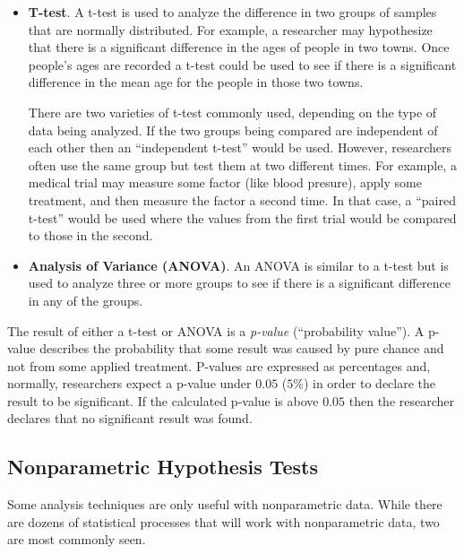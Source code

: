\begin{itemize}
	\item \textbf{T-test}. A t-test is used to analyze the difference in two groups of samples that are normally distributed. For example, a researcher may hypothesize that there is a significant difference in the ages of people in two towns. Once people's ages are recorded a t-test could be used to see if there is a significant difference in the mean age for the people in those two towns.
	
	There are two varieties of t-test commonly used, depending on the type of data being analyzed. If the two groups being compared are independent of each other then an ``independent t-test'' would be used. However, researchers often use the same group but test them at two different times. For example, a medical trial may measure some factor (like blood presure), apply some treatment, and then measure the factor a second time. In that case, a ``paired t-test'' would be used where the values from the first trial would be compared to those in the second.
	
	\item \textbf{Analysis of Variance (ANOVA)}. An ANOVA is similar to a t-test but is used to analyze three or more groups to see if there is a significant difference in any of the groups.
\end{itemize}

The result of either a t-test or ANOVA is a \textit{p-value} (``probability value''). A p-value describes the probability that some result was caused by pure chance and not from some applied treatment. P-values are expressed as percentages and, normally, researchers expect a p-value under $ 0.05 $ ($ 5\% $) in order to declare the result to be significant. If the calculated p-value is above $ 0.05 $ then the researcher declares that no significant result was found.

\subsection{Nonparametric Hypothesis Tests}

Some analysis techniques are only useful with \gls{nonparametric} data. While there are dozens of statistical processes that will work with nonparametric data, two are most commonly seen.

